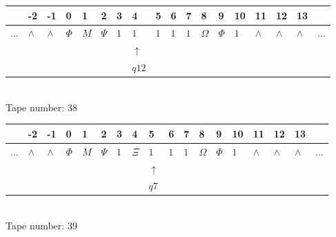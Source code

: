 \documentclass[11pt]{article}
\begin{document}
\begin{table}[H]
\centering
\begin{tabular}{llllllllllllllllll}
 & -2 & -1 & 0 & 1 & 2 & 3 & 4 & 5 & 6 & 7 & 8 & 9 & 10 & 11 & 12 & 13 & \\
\hline
$...$ & \multicolumn{1}{|l|}{$\wedge$} & \multicolumn{1}{|l|}{$\wedge$} & \multicolumn{1}{|l|}{$\Phi$} & \multicolumn{1}{|l|}{$M$} & \multicolumn{1}{|l|}{$\Psi$} & \multicolumn{1}{|l|}{$1$} & \multicolumn{1}{|l|}{$1$} & \multicolumn{1}{|l|}{$1$} & \multicolumn{1}{|l|}{$1$} & \multicolumn{1}{|l|}{$1$} & \multicolumn{1}{|l|}{$\Omega$} & \multicolumn{1}{|l|}{$\Phi$} & \multicolumn{1}{|l|}{$1$} & \multicolumn{1}{|l|}{$\wedge$} & \multicolumn{1}{|l|}{$\wedge$} & \multicolumn{1}{|l|}{$\wedge$} & $...$\\
\hline
&  &  &  &  &  &  & $\uparrow$ &  &  &  &  &  &  &  &  &  &  \\
&  &  &  &  &  &  & $ q12 $ &  &  &  &  &  &  &  &  &  &  \\
\end{tabular}
\\
Tape number: 38
\noindent\makebox[\linewidth]{\hdashrule{\textwidth}{1pt}{1pt}}\end{table}

\begin{table}[H]
\centering
\begin{tabular}{llllllllllllllllll}
 & -2 & -1 & 0 & 1 & 2 & 3 & 4 & 5 & 6 & 7 & 8 & 9 & 10 & 11 & 12 & 13 & \\
\hline
$...$ & \multicolumn{1}{|l|}{$\wedge$} & \multicolumn{1}{|l|}{$\wedge$} & \multicolumn{1}{|l|}{$\Phi$} & \multicolumn{1}{|l|}{$M$} & \multicolumn{1}{|l|}{$\Psi$} & \multicolumn{1}{|l|}{$1$} & \multicolumn{1}{|l|}{$\Xi$} & \multicolumn{1}{|l|}{$1$} & \multicolumn{1}{|l|}{$1$} & \multicolumn{1}{|l|}{$1$} & \multicolumn{1}{|l|}{$\Omega$} & \multicolumn{1}{|l|}{$\Phi$} & \multicolumn{1}{|l|}{$1$} & \multicolumn{1}{|l|}{$\wedge$} & \multicolumn{1}{|l|}{$\wedge$} & \multicolumn{1}{|l|}{$\wedge$} & $...$\\
\hline
&  &  &  &  &  &  &  & $\uparrow$ &  &  &  &  &  &  &  &  &  \\
&  &  &  &  &  &  &  & $ q7 $ &  &  &  &  &  &  &  &  &  \\
\end{tabular}
\\
Tape number: 39
\noindent\makebox[\linewidth]{\hdashrule{\textwidth}{1pt}{1pt}}\end{table}
\end{document}
